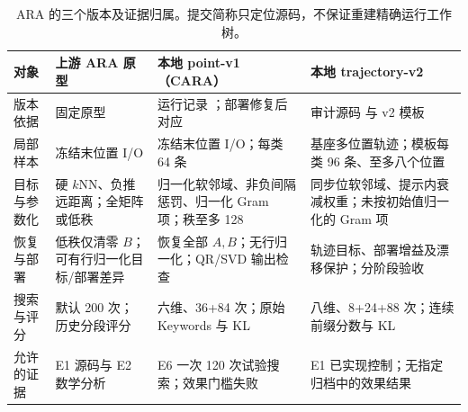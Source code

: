 \begin{table}[t]
\centering
\caption{ARA 的三个版本及证据归属。提交简称只定位源码，不保证重建精确运行工作树。}
\label{tab:ara-version-comparison}
\footnotesize
\setlength{\tabcolsep}{4pt}
\renewcommand{\arraystretch}{1.15}
\begin{tabularx}{\textwidth}{@{}p{24mm}Y Y Y@{}}
\toprule
对象 & 上游 ARA 原型 & 本地 point-v1（CARA） & 本地 trajectory-v2 \\
\midrule
版本依据 & 固定原型  & 运行记录 ；部署修复后对应  & 审计源码  与 v2 模板 \\
局部样本 & 冻结末位置 I/O & 冻结末位置 I/O；每类 64 条 & 基座多位置轨迹；模板每类 96 条、至多八个位置 \\
目标与参数化 & 硬 $k$NN、负推远距离；全矩阵或低秩 & 归一化软邻域、非负间隔惩罚、归一化 Gram 项；秩至多 128 & 同步位软邻域、提示内衰减权重；未按初始值归一化的 Gram 项 \\
恢复与部署 & 低秩仅清零 $B$；可有行归一化目标/部署差异 & 恢复全部 $A,B$；无行归一化；QR/SVD 输出检查 & 轨迹目标、部署增益及漂移保护；分阶段验收 \\
搜索与评分 & 默认 200 次；历史分段评分 & 六维、36+84 次；原始 Keywords 与 KL & 八维、8+24+88 次；连续前缀分数与 KL \\
允许的证据 & E1 源码与 E2 数学分析 & E6 一次 120 次试验搜索；效果门槛失败 & E1 已实现控制；无指定归档中的效果结果 \\
\bottomrule
\end{tabularx}
\end{table}
